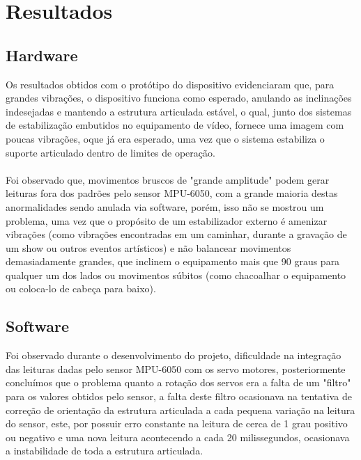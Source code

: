 
\chapter{Resultados}\label{cap:resultadosediscussao}

\section{Hardware}
Os resultados obtidos com o protótipo do dispositivo evidenciaram que, para grandes vibrações, o dispositivo funciona como esperado, anulando as inclinações indesejadas e mantendo a estrutura articulada estável, o qual, junto dos sistemas de estabilização embutidos no equipamento de vídeo, fornece uma imagem com poucas vibrações, oque já era esperado, uma vez que o sistema estabiliza o suporte articulado dentro de limites de operação.\\
\\
\indent Foi observado que, movimentos bruscos de "grande amplitude" podem gerar leituras fora dos padrões pelo sensor MPU-6050, com a grande maioria destas anormalidades sendo anulada via software, porém, isso não se mostrou um problema, uma vez que o propósito de um estabilizador externo é amenizar vibrações (como vibrações encontradas em um caminhar, durante a gravação de um show ou outros eventos artísticos) e não balancear movimentos demasiadamente grandes, que inclinem o equipamento mais que 90 graus para qualquer um dos lados ou movimentos súbitos (como chacoalhar o equipamento ou coloca-lo de cabeça para baixo).

\section{Software}
Foi observado durante o desenvolvimento do projeto, dificuldade na integração das leituras dadas pelo sensor MPU-6050 com os servo motores, posteriormente concluímos que o problema quanto a rotação dos servos era a falta de um "filtro" para os valores obtidos pelo sensor, a falta deste filtro ocasionava na tentativa de correção de orientação da estrutura articulada a cada pequena variação na leitura do sensor, este, por possuir erro constante na leitura de cerca de 1 grau positivo ou negativo e uma nova leitura acontecendo a cada 20 milissegundos, ocasionava a instabilidade de toda a estrutura articulada.

